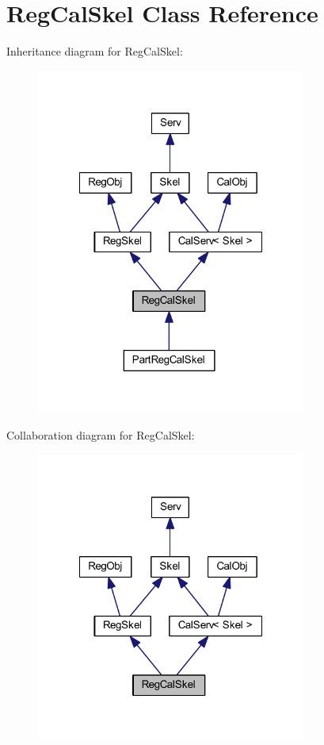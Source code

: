 \hypertarget{class_reg_cal_skel}{
\section{RegCalSkel Class Reference}
\label{class_reg_cal_skel}
}


Inheritance diagram for RegCalSkel:\nopagebreak
\begin{figure}[H]
\begin{center}
\leavevmode
\includegraphics[width=251pt]{class_reg_cal_skel__inherit__graph}
\end{center}
\end{figure}


Collaboration diagram for RegCalSkel:\nopagebreak
\begin{figure}[H]
\begin{center}
\leavevmode
\includegraphics[width=251pt]{class_reg_cal_skel__coll__graph}
\end{center}
\end{figure}

